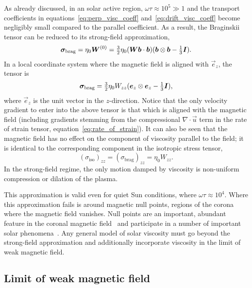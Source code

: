 As already discussed, in an solar active region, $\omega \tau \approx 10^5 \gg 1$ and the transport coefficients in equations~\ref{eq:perp_visc_coeff} and~\ref{eq:drift_visc_coeff} become negligibly small compared to the parallel coefficient. As a result, the Braginskii tensor can be reduced to its strong-field approximation,
\begin{equation}
  \label{eq:strong_field_approx}
{\bm \sigma}_{\text{brag}} = \eta_0 {\bm W}^{(0)} = \tfrac{3}{2} \eta_0 ({\bm W} {\bm b} \cdot {\bm b}) ( {\bm b} \otimes {\bm b} - \tfrac{1}{3} {\bm I}).
\end{equation}
In a local coordinate system where the magnetic field is aligned with $\vec{e}_z$, the tensor is
\begin{equation}
  \label{eq:z_aligned_strong_field_approx}
{\bm \sigma}_{\text{brag}} = \tfrac{3}{2} \eta_0 W_{zz} ( {\bm e}_z \otimes {\bm e}_z - \tfrac{1}{3} {\bm I}),
\end{equation}
where $\vec{e}_z$ is the unit vector in the $z$-direction. Notice that the only velocity gradient to enter into the above tensor is that which is aligned with the magnetic field (including gradients stemming from the compressional $\nabla \cdot \vec{u}$ term in the rate of strain tensor, equation~\ref{eq:rate_of_strain}). It can also be seen that the magnetic field has no effect on the component of viscosity parallel to the field; it is identical to the corresponding component in the isotropic stress tensor,
\begin{equation}
  \label{eq:z_aligned_iso}
  (\sigma_{\text{iso}})_{zz} = (\sigma_{\text{brag}})_{zz} = \eta_0 W_{zz}.
\end{equation}
In the strong-field regime, the only motion damped by viscosity is non-uniform compression or dilation of the plasma. 

This approximation is valid even for quiet Sun conditions, where $\omega\tau \approx 10^4$. Where this approximation fails is around magnetic null points, regions of the corona where the magnetic field vanishes. Null points are an important, abundant feature in the coronal magnetic field~\cite{edwardsNullPointDistribution2015} and participate in a number of important solar phenomena~\cite{massonNATUREFLARERIBBONS2009,moreno-insertisPLASMAJETSERUPTIONS2013,barnesRelationshipCoronalMagnetic2007}. Any general model of solar viscosity must go beyond the strong-field approximation and additionally incorporate viscosity in the limit of weak magnetic field.

\subsection{Limit of weak magnetic field}

